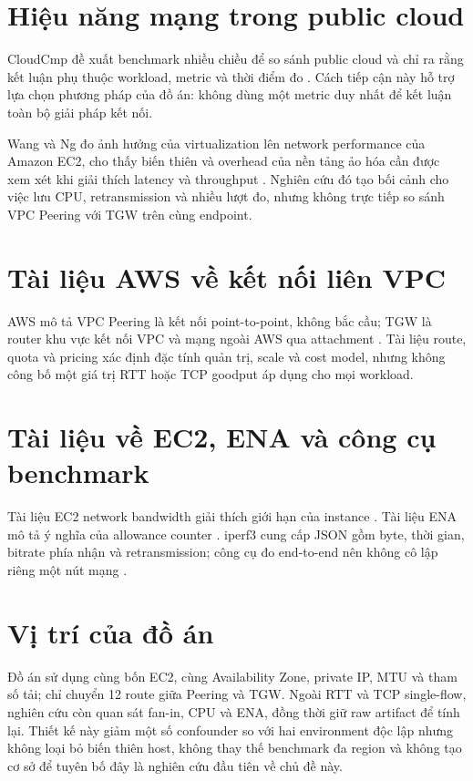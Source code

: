 \section{Hiệu năng mạng trong public cloud}

CloudCmp đề xuất benchmark nhiều chiều để so sánh public cloud và chỉ ra rằng
kết luận phụ thuộc workload, metric và thời điểm đo \cite{cloudcmp}. Cách tiếp
cận này hỗ trợ lựa chọn phương pháp của đồ án: không dùng một metric duy nhất
để kết luận toàn bộ giải pháp kết nối.

Wang và Ng đo ảnh hưởng của virtualization lên network performance của Amazon
EC2, cho thấy biến thiên và overhead của nền tảng ảo hóa cần được xem xét khi
giải thích latency và throughput \cite{wang-ec2-network}. Nghiên cứu đó tạo
bối cảnh cho việc lưu CPU, retransmission và nhiều lượt đo, nhưng không trực
tiếp so sánh VPC Peering với TGW trên cùng endpoint.

\section{Tài liệu AWS về kết nối liên VPC}

AWS mô tả VPC Peering là kết nối point-to-point, không bắc cầu; TGW là router
khu vực kết nối VPC và mạng ngoài AWS qua attachment
\cite{aws-vpc-peering,aws-tgw-overview}. Tài liệu route, quota và pricing xác
định đặc tính quản trị, scale và cost model, nhưng không công bố một giá trị
RTT hoặc TCP goodput áp dụng cho mọi workload.

\section{Tài liệu về EC2, ENA và công cụ benchmark}

Tài liệu EC2 network bandwidth giải thích giới hạn của instance
\cite{aws-ec2-bandwidth}. Tài liệu ENA mô tả ý nghĩa của allowance counter
\cite{aws-ena-metrics}. iperf3 cung cấp JSON gồm byte, thời gian, bitrate phía
nhận và retransmission; công cụ đo end-to-end nên không cô lập riêng một nút
mạng \cite{iperf3-docs}.

\section{Vị trí của đồ án}

Đồ án sử dụng cùng bốn EC2, cùng Availability Zone, private IP, MTU và tham số
tải; chỉ chuyển 12 route giữa Peering và TGW. Ngoài RTT và TCP single-flow,
nghiên cứu còn quan sát fan-in, CPU và ENA, đồng thời giữ raw artifact để tính
lại. Thiết kế này giảm một số confounder so với hai environment độc lập nhưng
không loại bỏ biến thiên host, không thay thế benchmark đa region và không tạo
cơ sở để tuyên bố đây là nghiên cứu đầu tiên về chủ đề này.

